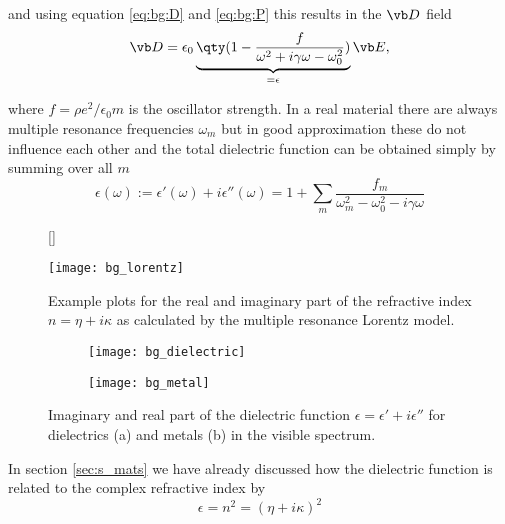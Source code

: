 and using equation \eqref{eq:bg:D} and \eqref{eq:bg:P} this results in the $\vb D$ field
\begin{equation}
    \vb D = 
    \epsilon_0 \underbrace{ 
    \qty(1 - \frac{f}{\omega^2 + i \gamma \omega - \omega_0^2})
    }_{
        =\epsilon
    }
    \vb E,
\end{equation}

where $f = \rho e^2 / \epsilon_0 m$ is the oscillator strength.
In a real material there are always multiple resonance frequencies $\omega_m$ but in good approximation these do not influence each other and the total dielectric function can be obtained simply by summing over all $m$ \cite{FOMO}
\begin{equation}
    \epsilon(\omega) := 
    \epsilon'(\omega) + i \epsilon''(\omega) = 
    1 + \sum_m \frac{f_m}{\omega_m^2 - \omega_0^2 - i \gamma \omega}
\end{equation}

\begin{figure}[H]
    [\FBwidth]
    {\caption{
        Example plots for the real and imaginary part of the refractive index 
        $n = \eta + i\kappa$
        as calculated by the multiple resonance Lorentz model.
        \cite{FOMO}
    }
    \label{fig:bg:lorentz}}
    {\texttt{[image: bg\_lorentz]}}
\end{figure}

\begin{figure}[H]
    \centering
    \begin{subfigure}{.5\textwidth}
        \centering
        \texttt{[image: bg\_dielectric]}
        \caption{}
        \label{fig:bg:dielectric}
    \end{subfigure}%
    \begin{subfigure}{.5\textwidth}
        \centering
        \texttt{[image: bg\_metal]}
        \caption{}
        \label{fig:bg:metal}
    \end{subfigure}
    \caption{Imaginary and real part of the dielectric function 
    $\epsilon = \epsilon' + i \epsilon''$
    for dielectrics (a) and metals (b) in the visible spectrum.
    \cite{FOMO}}
    \label{fig:bg:dm}
    \end{figure}

In section \ref{sec:s_mats} we have already discussed how the dielectric function is related to the complex refractive index by
\begin{equation}
    \epsilon = n^2 = (\eta + i \kappa)^2
\end{equation}

